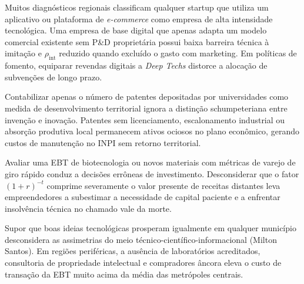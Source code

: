 
\begin{boxErro}
Muitos diagnósticos regionais classificam qualquer startup que utiliza um aplicativo ou plataforma de \textit{e-commerce} como empresa de alta intensidade tecnológica. Uma empresa de base digital que apenas adapta um modelo comercial existente sem P\&D proprietária possui baixa barreira técnica à imitação e $\rho_{\text{int}}$ reduzido quando excluído o gasto com marketing. Em políticas de fomento, equiparar revendas digitais a \textit{Deep Techs} distorce a alocação de subvenções de longo prazo.
\end{boxErro}

\begin{boxErro}
Contabilizar apenas o número de patentes depositadas por universidades como medida de desenvolvimento territorial ignora a distinção schumpeteriana entre invenção e inovação. Patentes sem licenciamento, escalonamento industrial ou absorção produtiva local permanecem ativos ociosos no plano econômico, gerando custos de manutenção no INPI sem retorno territorial.
\end{boxErro}

\begin{boxErro}
Avaliar uma EBT de biotecnologia ou novos materiais com métricas de varejo de giro rápido conduz a decisões errôneas de investimento. Desconsiderar que o fator $(1+r)^{-t}$ comprime severamente o valor presente de receitas distantes leva empreendedores a subestimar a necessidade de capital paciente e a enfrentar insolvência técnica no chamado vale da morte.
\end{boxErro}

\begin{boxErro}
Supor que boas ideias tecnológicas prosperam igualmente em qualquer município desconsidera as assimetrias do meio técnico-científico-informacional (Milton Santos). Em regiões periféricas, a ausência de laboratórios acreditados, consultoria de propriedade intelectual e compradores âncora eleva o custo de transação da EBT muito acima da média das metrópoles centrais.
\end{boxErro}


